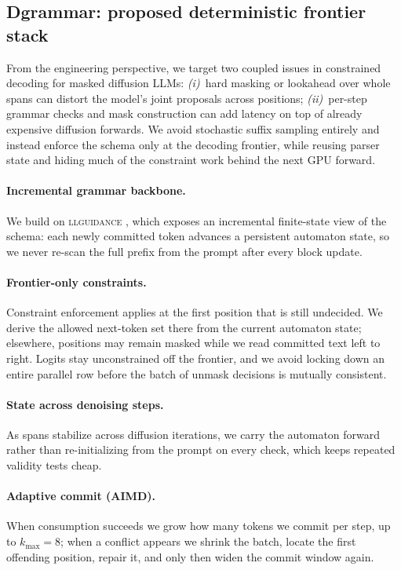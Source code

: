 \subsection{Dgrammar: proposed deterministic frontier stack}
\label{sec:dgrammar}
From the engineering perspective, we target two coupled issues in constrained decoding for masked diffusion LLMs: \emph{(i)}~hard masking or lookahead over whole spans can distort the model's joint proposals across positions; \emph{(ii)}~per-step grammar checks and mask construction can add latency on top of already expensive diffusion forwards. We avoid stochastic suffix sampling entirely and instead enforce the schema only at the decoding frontier, while reusing parser state and hiding much of the constraint work behind the next GPU forward.

\paragraph{Incremental grammar backbone.}
We build on \textsc{llguidance} \citep{microsoft2025llguidance}, which exposes an incremental finite-state view of the schema: each newly committed token advances a persistent automaton state, so we never re-scan the full prefix from the prompt after every block update.

\paragraph{Frontier-only constraints.}
Constraint enforcement applies at the first position that is still undecided. We derive the allowed next-token set there from the current automaton state; elsewhere, positions may remain masked while we read committed text left to right. Logits stay unconstrained off the frontier, and we avoid locking down an entire parallel row before the batch of unmask decisions is mutually consistent.

\paragraph{State across denoising steps.}
As spans stabilize across diffusion iterations, we carry the automaton forward rather than re-initializing from the prompt on every check, which keeps repeated validity tests cheap.

\paragraph{Adaptive commit (AIMD).}
When consumption succeeds we grow how many tokens we commit per step, up to $k_{\max}{=}8$; when a conflict appears we shrink the batch, locate the first offending position, repair it, and only then widen the commit window again.

